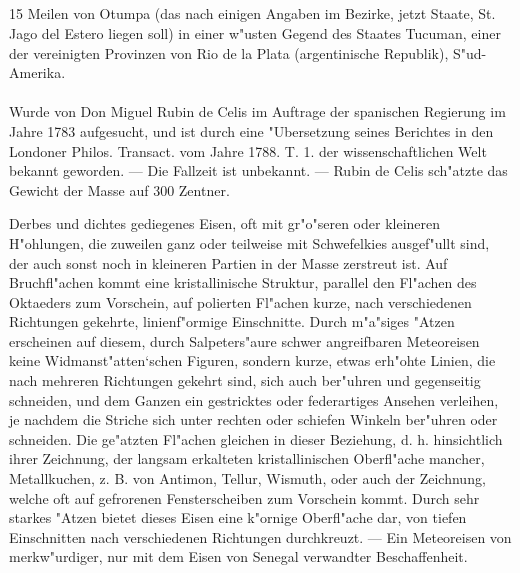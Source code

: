 \documentclass[a4paper, 11pt, oneside, polutonikogreek, german]{article}
\begin{document}
\setlength{\leftskip}{0pt}
\setlength{\parindent}{20pt}

\subsection[\frakfamily{Tucuman.}]{}
\begin{center}

15 Meilen von Otumpa (das nach einigen Angaben im Bezirke, jetzt Staate, St. Jago del Estero liegen soll) in einer w"usten Gegend des Staates Tucuman, einer der vereinigten Provinzen von Rio de la Plata (argentinische Republik), S"ud-Amerika.
\end{center}
\paragraph{}
Wurde von Don Miguel Rubin de Celis im Auftrage der spanischen Regierung im Jahre 1783 aufgesucht, und ist durch eine "Ubersetzung seines Berichtes in den Londoner Philos. Transact. vom Jahre 1788. T. 1. der wissenschaftlichen Welt bekannt geworden. --- Die Fallzeit ist unbekannt. --- Rubin de Celis sch"atzte das Gewicht der Masse auf 300 Zentner.

Derbes und dichtes gediegenes Eisen, oft mit gr"o"seren oder kleineren H"ohlungen, die zuweilen ganz oder teilweise mit Schwefelkies ausgef"ullt sind, der auch sonst noch in kleineren Partien in der Masse zerstreut ist. Auf Bruchfl"achen kommt eine kristallinische Struktur, parallel den Fl"achen des Oktaeders zum Vorschein, auf polierten Fl"achen kurze, nach verschiedenen Richtungen gekehrte, linienf"ormige Einschnitte. Durch m"a"siges "Atzen erscheinen auf diesem, durch Salpeters"aure schwer angreifbaren Meteoreisen keine Widmanst"atten‘schen Figuren, sondern kurze, etwas erh"ohte Linien, die nach mehreren Richtungen gekehrt sind, sich auch ber"uhren und gegenseitig schneiden, und dem Ganzen ein gestricktes oder federartiges Ansehen verleihen, je nachdem die Striche sich unter rechten oder schiefen Winkeln ber"uhren oder schneiden. Die ge"atzten Fl"achen gleichen in dieser Beziehung, d. h. hinsichtlich ihrer Zeichnung, der langsam erkalteten kristallinischen Oberfl"ache mancher, Metallkuchen, z. B. von Antimon, Tellur, Wismuth, oder auch der Zeichnung, welche oft auf gefrorenen Fensterscheiben zum Vorschein kommt. Durch sehr starkes "Atzen bietet dieses Eisen eine k"ornige Oberfl"ache dar, von tiefen Einschnitten nach verschiedenen Richtungen durchkreuzt. --- Ein Meteoreisen von merkw"urdiger, nur mit dem Eisen von Senegal verwandter Beschaffenheit.
\end{document}
